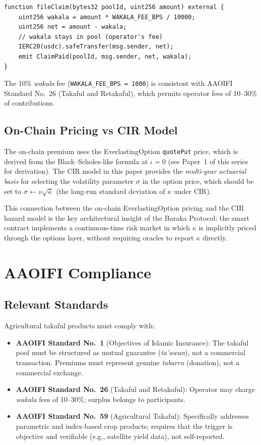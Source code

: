 \documentclass[12pt,a4paper]{article}
\newcommand{\kbar}{\bar{\kappa}}
\newcommand{\tabarru}{\textit{tabarru}}
\newcommand{\wakala}{\textit{wakala}}
\begin{document}
\begin{verbatim}
function fileClaim(bytes32 poolId, uint256 amount) external {
    uint256 wakala = amount * WAKALA_FEE_BPS / 10000;
    uint256 net = amount - wakala;
    // wakala stays in pool (operator's fee)
    IERC20(usdc).safeTransfer(msg.sender, net);
    emit ClaimPaid(poolId, msg.sender, net, wakala);
}
\end{verbatim}

The 10\% \wakala{} fee (\texttt{WAKALA\_FEE\_BPS = 1000}) is consistent with
AAOIFI Standard No.~26 (Takaful and Retakaful), which permits operator fees of
10--30\% of contributions.

\subsection{On-Chain Pricing vs CIR Model}

The on-chain premium uses the EverlastingOption \texttt{quotePut} price, which is
derived from the Black--Scholes-like formula at $\iota=0$ (see Paper~1 of this series
for derivation).
The CIR model in this paper provides the \emph{multi-year actuarial basis} for
selecting the volatility parameter $\sigma$ in the option price, which should be set
to $\sigma \leftarrow \nu\sqrt{\kbar}$ (the long-run standard deviation of $\kappa$
under CIR).

This connection between the on-chain EverlastingOption pricing and the CIR hazard
model is the key architectural insight of the Baraka Protocol:
the smart contract implements a continuous-time risk market in which $\kappa$ is
implicitly priced through the options layer, without requiring oracles to report
$\kappa$ directly.

\section{AAOIFI Compliance}
\label{sec:aaoifi}

\subsection{Relevant Standards}

Agricultural takaful products must comply with:
\begin{itemize}
  \item \textbf{AAOIFI Standard No.~1} (Objectives of Islamic Insurance): The takaful
    pool must be structured as mutual guarantee (\textit{ta'awun}), not a commercial
    transaction. Premiums must represent genuine \tabarru{} (donation), not a
    commercial exchange.
  \item \textbf{AAOIFI Standard No.~26} (Takaful and Retakaful): Operator may charge
    \wakala{} fees of 10--30\%; surplus belongs to participants.
  \item \textbf{AAOIFI Standard No.~59} (Agricultural Takaful): Specifically addresses
    parametric and index-based crop products; requires that the trigger is objective
    and verifiable (e.g., satellite yield data), not self-reported.
\end{itemize}
\end{document}
